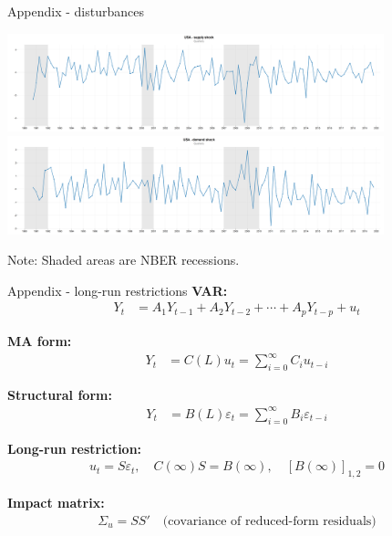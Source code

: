\documentclass[10pt,leqno,aspectratio=169,presentation]{beamer} %
\begin{document}
\begin{frame}{Appendix - disturbances}
\label{disturb}
    \begin{center}
        \includegraphics[width=0.82\textwidth]{Slides/usa_gdp_shocks.png}
        \includegraphics[width=0.82\textwidth]{Slides/usa_unemp_shocks.png}
    \begin{minipage}{0.85\textwidth}
    \footnotesize
    Note: Shaded areas are NBER recessions.
    \end{minipage}
    \end{center}
\hfill  \hyperlink{main}{}
\end{frame}

\begin{frame}{Appendix - long-run restrictions}
\label{LRvar}
\footnotesize
\textbf{VAR:}
\begin{align*}
Y_t &= A_1 Y_{t-1} + A_2 Y_{t-2} + \cdots + A_p Y_{t-p} + u_t
\end{align*}

\textbf{MA form:}
\begin{align*}
Y_t &= C(L) u_t = \sum_{i=0}^\infty C_i u_{t-i}
\end{align*}

\textbf{Structural form:}
\begin{align*}
Y_t &= B(L) \varepsilon_t = \sum_{i=0}^\infty B_i \varepsilon_{t-i}
\end{align*}

\textbf{Long-run restriction:}
\begin{align*}
u_t = S \varepsilon_t, \quad C(\infty) S = B(\infty), \quad 
\left[ B(\infty) \right]_{1,2} = 0
\end{align*}

\textbf{Impact matrix:}
\begin{align*}
\Sigma_u = SS' \quad \text{(covariance of reduced-form residuals)}
\end{align*}

\hfill \hyperlink{VAR}{}
\end{frame}


\begin{frame}[allowframebreaks]


\end{frame}
\end{document}
